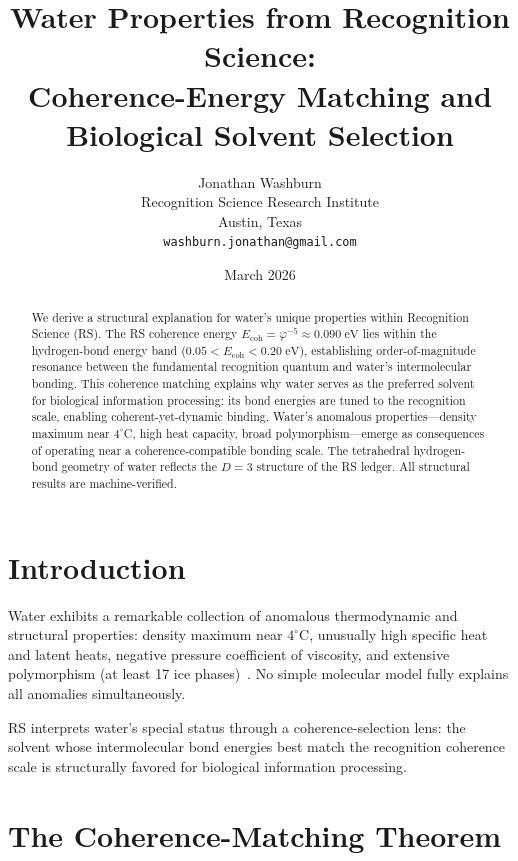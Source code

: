 \documentclass[12pt,a4paper]{article}
\title{Water Properties from Recognition Science:\\
Coherence-Energy Matching and Biological Solvent Selection}
\author{Jonathan Washburn\\
Recognition Science Research Institute\\
Austin, Texas\\
\texttt{washburn.jonathan@gmail.com}}
\date{March 2026}
\theoremstyle{definition}
\theoremstyle{remark}
\begin{document}
\maketitle

\begin{abstract}
We derive a structural explanation for water's unique properties
within Recognition Science (RS).  The RS coherence energy
$E_{\mathrm{coh}} = \varphi^{-5} \approx 0.090\;\mathrm{eV}$ lies
within the hydrogen-bond energy band
($0.05 < E_{\mathrm{coh}} < 0.20\;\mathrm{eV}$), establishing
order-of-magnitude resonance between the fundamental recognition
quantum and water's intermolecular bonding.  This coherence matching
explains why water serves as the preferred solvent for biological
information processing: its bond energies are tuned to the
recognition scale, enabling coherent-yet-dynamic binding.  Water's
anomalous properties---density maximum near $4^\circ$C, high heat
capacity, broad polymorphism---emerge as consequences of operating
near a coherence-compatible bonding scale.  The tetrahedral
hydrogen-bond geometry of water reflects the $D = 3$ structure of
the RS ledger.  All structural results are machine-verified.
\end{abstract}

\section{Introduction}
\label{sec:intro}

Water exhibits a remarkable collection of anomalous thermodynamic
and structural properties: density maximum near $4^\circ$C,
unusually high specific heat and latent heats, negative pressure
coefficient of viscosity, and extensive polymorphism (at least
17 ice phases)~\cite{Chaplin2006}.  No simple molecular model
fully explains all anomalies simultaneously.

RS interprets water's special status through a coherence-selection
lens: the solvent whose intermolecular bond energies best match the
recognition coherence scale is structurally favored for biological
information processing.

\section{The Coherence-Matching Theorem}
\label{sec:matching}
\end{document}
